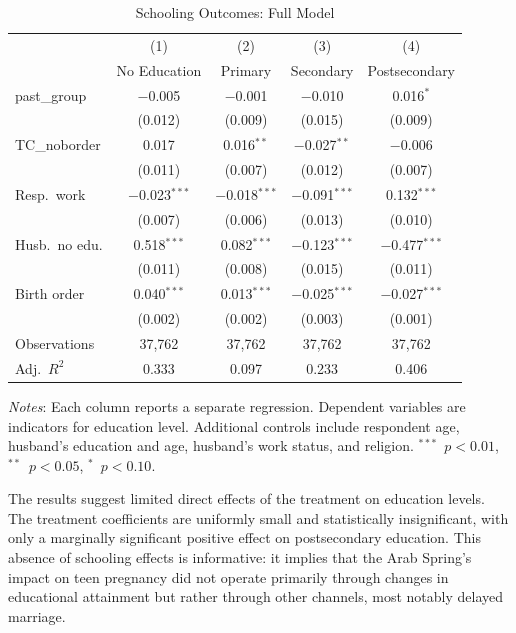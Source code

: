 \documentclass[12pt,a4paper]{article}
\begin{document}
\begin{table}[H]
\centering
\begin{threeparttable}
\caption{Schooling Outcomes: Full Model}
\label{tab:schooling}
\small
\begin{tabular}{@{}lcccc@{}}
\toprule
 & (1) & (2) & (3) & (4) \\
 & No Education & Primary & Secondary & Postsecondary \\
\midrule
past\_group  & $-$0.005 & $-$0.001 & $-$0.010 & 0.016$^{*}$ \\
             & (0.012) & (0.009) & (0.015) & (0.009) \\[3pt]
TC\_noborder & 0.017 & 0.016$^{**}$ & $-$0.027$^{**}$ & $-$0.006 \\
             & (0.011) & (0.007) & (0.012) & (0.007) \\[3pt]
Resp.\ work  & $-$0.023$^{***}$ & $-$0.018$^{***}$ & $-$0.091$^{***}$ & 0.132$^{***}$ \\
             & (0.007) & (0.006) & (0.013) & (0.010) \\[3pt]
Husb.\ no edu. & 0.518$^{***}$ & 0.082$^{***}$ & $-$0.123$^{***}$ & $-$0.477$^{***}$ \\
             & (0.011) & (0.008) & (0.015) & (0.011) \\[3pt]
Birth order  & 0.040$^{***}$ & 0.013$^{***}$ & $-$0.025$^{***}$ & $-$0.027$^{***}$ \\
             & (0.002) & (0.002) & (0.003) & (0.001) \\[4pt]
\midrule
Observations & 37,762 & 37,762 & 37,762 & 37,762 \\
Adj.\ $R^2$  & 0.333  & 0.097  & 0.233  & 0.406 \\
\bottomrule
\end{tabular}
\begin{tablenotes}[flushleft]
\footnotesize
\item \textit{Notes}: Each column reports a separate regression. Dependent variables are indicators for education level. Additional controls include respondent age, husband's education and age, husband's work status, and religion. $^{***}$~$p<0.01$, $^{**}$~$p<0.05$, $^{*}$~$p<0.10$.
\end{tablenotes}
\end{threeparttable}
\end{table}

\noindent The results suggest limited direct effects of the treatment on education levels. The treatment coefficients are uniformly small and statistically insignificant, with only a marginally significant positive effect on postsecondary education. This absence of schooling effects is informative: it implies that the Arab Spring's impact on teen pregnancy did not operate primarily through changes in educational attainment but rather through other channels, most notably delayed marriage.
\vspace{0.25cm}
\end{document}
